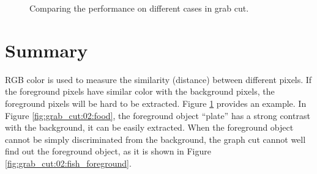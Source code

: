 \documentclass[paper=a4, fontsize=11pt]{scrartcl}
\begin{document}
\begin{figure}[h]
\centering
{}
\caption{ Comparing the performance on different cases in grab cut. }
\label{fig:grab_cut:02}
\end{figure}

\section{Summary}

RGB color is used to measure the similarity (distance) between different pixels.
If the foreground pixels have similar color with the background pixels, the foreground pixels will be hard to be extracted.
Figure \ref{fig:grab_cut:02} provides an example.
In Figure \ref{fig:grab_cut:02:food}, the foreground object ``plate'' has a strong contrast with the background, it can be easily extracted.
When the foreground object cannot be simply discriminated from the background, the graph cut cannot well find out the foreground object, as it is shown in Figure \ref{fig:grab_cut:02:fish_foreground}.
\end{document}
